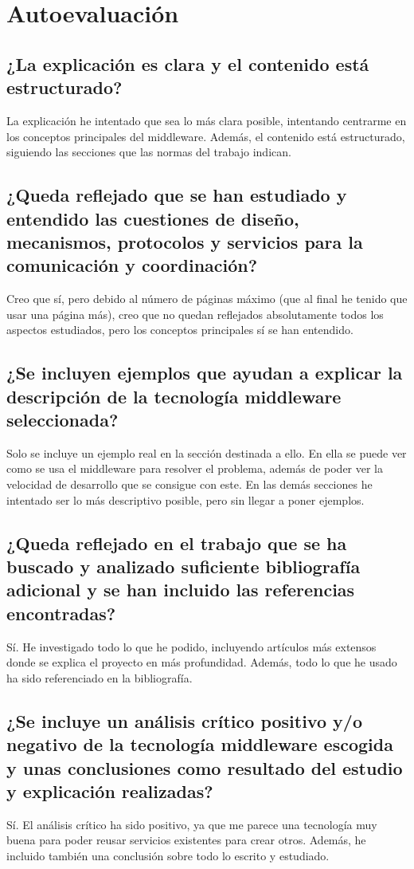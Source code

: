 \documentclass[runningheads]{llncs}
\begin{document}
\section{Autoevaluación}
\subsection{¿La explicación es clara y el contenido está estructurado?}
La explicación he intentado que sea lo más clara posible, intentando centrarme en los conceptos principales del middleware. Además, el contenido está estructurado, siguiendo las secciones que las normas del trabajo indican.

\subsection{¿Queda reflejado que se han estudiado y entendido las cuestiones de diseño, mecanismos, protocolos y servicios para la comunicación y coordinación?}
Creo que sí, pero debido al número de páginas máximo (que al final he tenido que usar una página más), creo que no quedan reflejados absolutamente todos los aspectos estudiados, pero los conceptos principales sí se han entendido.

\subsection{¿Se incluyen ejemplos que ayudan a explicar la descripción de la tecnología middleware seleccionada?}
Solo se incluye un ejemplo real en la sección destinada a ello. En ella se puede ver como se usa el middleware para resolver el problema, además de poder ver la velocidad de desarrollo que se consigue con este. En las demás secciones he intentado ser lo más descriptivo posible, pero sin llegar a poner ejemplos.

\subsection{¿Queda reflejado en el trabajo que se ha buscado y analizado suficiente bibliografía adicional y se han incluido las referencias encontradas?}
Sí. He investigado todo lo que he podido, incluyendo artículos más extensos donde se explica el proyecto en más profundidad. Además, todo lo que he usado ha sido referenciado en la bibliografía.

\subsection{¿Se incluye un análisis crítico positivo y/o negativo de la tecnología middleware escogida y unas conclusiones como resultado del estudio y explicación realizadas?}
Sí. El análisis crítico ha sido positivo, ya que me parece una tecnología muy buena para poder reusar servicios existentes para crear otros. Además, he incluido también una conclusión sobre todo lo escrito y estudiado.
\end{document}
